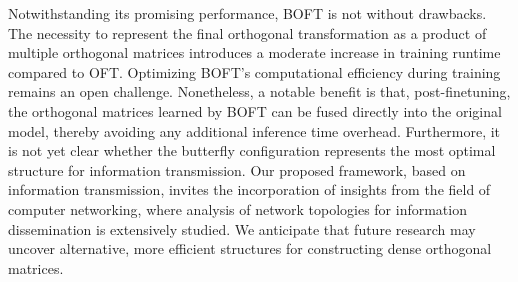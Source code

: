 Notwithstanding its promising performance, BOFT is not without drawbacks. The necessity to represent the final orthogonal transformation as a product of multiple orthogonal matrices introduces a moderate increase in training runtime compared to OFT. Optimizing BOFT’s computational efficiency during training remains an open challenge. Nonetheless, a notable benefit is that, post-finetuning, the orthogonal matrices learned by BOFT can be fused directly into the original model, thereby avoiding any additional inference time overhead. Furthermore, it is not yet clear whether the butterfly configuration represents the most optimal structure for information transmission. Our proposed framework, based on information transmission, invites the incorporation of insights from the field of computer networking, where analysis of network topologies for information dissemination is extensively studied. We anticipate that future research may uncover alternative, more efficient structures for constructing dense orthogonal matrices.